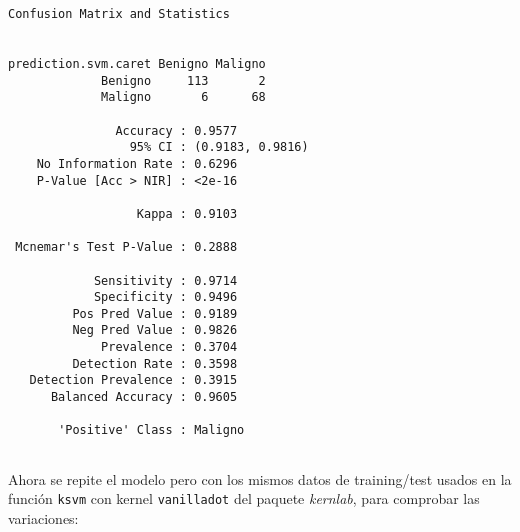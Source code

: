 \documentclass[
]{article}
\newenvironment{Shaded}{\begin{snugshade}}{\end{snugshade}}
\newcommand{\CommentTok}[1]{\textcolor[rgb]{0.56,0.35,0.01}{\textit{#1}}}
\newcommand{\DataTypeTok}[1]{\textcolor[rgb]{0.13,0.29,0.53}{#1}}
\newcommand{\KeywordTok}[1]{\textcolor[rgb]{0.13,0.29,0.53}{\textbf{#1}}}
\newcommand{\NormalTok}[1]{#1}
\newcommand{\OperatorTok}[1]{\textcolor[rgb]{0.81,0.36,0.00}{\textbf{#1}}}
\newcommand{\OtherTok}[1]{\textcolor[rgb]{0.56,0.35,0.01}{#1}}
\newcommand{\StringTok}[1]{\textcolor[rgb]{0.31,0.60,0.02}{#1}}
\begin{document}
\begin{verbatim}
Confusion Matrix and Statistics

                    
prediction.svm.caret Benigno Maligno
             Benigno     113       2
             Maligno       6      68
                                          
               Accuracy : 0.9577          
                 95% CI : (0.9183, 0.9816)
    No Information Rate : 0.6296          
    P-Value [Acc > NIR] : <2e-16          
                                          
                  Kappa : 0.9103          
                                          
 Mcnemar's Test P-Value : 0.2888          
                                          
            Sensitivity : 0.9714          
            Specificity : 0.9496          
         Pos Pred Value : 0.9189          
         Neg Pred Value : 0.9826          
             Prevalence : 0.3704          
         Detection Rate : 0.3598          
   Detection Prevalence : 0.3915          
      Balanced Accuracy : 0.9605          
                                          
       'Positive' Class : Maligno         
                                          
\end{verbatim}

Ahora se repite el modelo pero con los mismos datos de training/test
usados en la función \texttt{ksvm} con kernel \texttt{vanilladot} del
paquete \emph{kernlab}, para comprobar las variaciones:

\begin{Shaded}
\end{Shaded}
\end{document}
